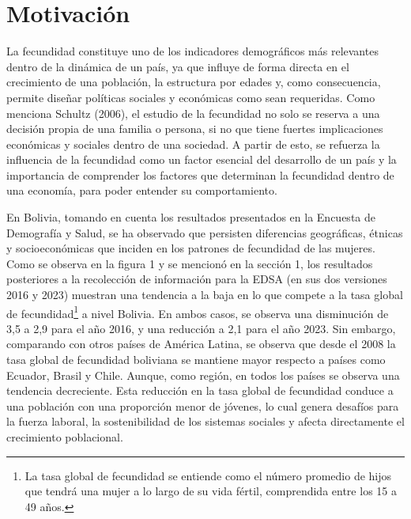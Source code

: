 \documentclass[Royal,times,sageh]{sagej}
\begin{document}
\section{Motivación}\label{motivaciuxf3n}

La fecundidad constituye uno de los indicadores demográficos más
relevantes dentro de la dinámica de un país, ya que influye de forma
directa en el crecimiento de una población, la estructura por edades y,
como consecuencia, permite diseñar políticas sociales y económicas como
sean requeridas. Como menciona Schultz (2006), el estudio de la
fecundidad no solo se reserva a una decisión propia de una familia o
persona, si no que tiene fuertes implicaciones económicas y sociales
dentro de una sociedad. A partir de esto, se refuerza la influencia de
la fecundidad como un factor esencial del desarrollo de un país y la
importancia de comprender los factores que determinan la fecundidad
dentro de una economía, para poder entender su comportamiento.

En Bolivia, tomando en cuenta los resultados presentados en la Encuesta
de Demografía y Salud, se ha observado que persisten diferencias
geográficas, étnicas y socioeconómicas que inciden en los patrones de
fecundidad de las mujeres. Como se observa en la figura 1 y se mencionó
en la sección 1, los resultados posteriores a la recolección de
información para la EDSA (en sus dos versiones 2016 y 2023) muestran una
tendencia a la baja en lo que compete a la tasa global de
fecundidad\footnote{La tasa global de fecundidad se entiende como el
  número promedio de hijos que tendrá una mujer a lo largo de su vida
  fértil, comprendida entre los 15 a 49 años.} a nivel Bolivia. En ambos
casos, se observa una disminución de 3,5 a 2,9 para el año 2016, y una
reducción a 2,1 para el año 2023. Sin embargo, comparando con otros
países de América Latina, se observa que desde el 2008 la tasa global de
fecundidad boliviana se mantiene mayor respecto a países como Ecuador,
Brasil y Chile. Aunque, como región, en todos los países se observa una
tendencia decreciente. Esta reducción en la tasa global de fecundidad
conduce a una población con una proporción menor de jóvenes, lo cual
genera desafíos para la fuerza laboral, la sostenibilidad de los
sistemas sociales y afecta directamente el crecimiento poblacional.
\end{document}
